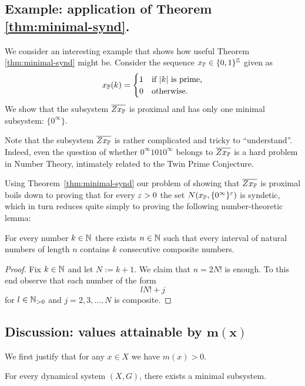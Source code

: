 \subsection*{Example: application of Theorem \ref{thm:minimal-synd}.}
\begin{example}
We consider an interesting example that shows how useful Theorem \ref{thm:minimal-synd} might be. Consider the sequence $x_{\mathbb{P}}\in \{0,1\}^{\mathbb{Z}}$ 
given as
$$
x_{\mathbb{P}}(k) = \begin{cases}
1 & \mbox{if $|k|$ is prime,} \\
0 & \mbox{otherwise.}\end{cases}$$
\noindent We show that the subsystem $\overline{Zx_{\mathbb{P}}}$ is proximal and has only one minimal subsystem: $\{0^\infty\}$.

Note that the subsystem $\overline{Zx_{\mathbb{P}}}$ is rather complicated and tricky to ``understand''. Indeed, even the question of whether $0^\infty 1 0 1 0^\infty$ belongs to $\overline{Zx_{\mathbb{P}}}$ is a hard problem in Number Theory, intimately related to the Twin Prime Conjecture.

Using Theorem~\ref{thm:minimal-synd} our problem of showing that $\overline{Zx_{\mathbb{P}}}$ is proximal boils down to proving that for every $\varepsilon>0$ the set $N(x_{\mathbb{P}}, \{0^\infty\}^\varepsilon)$ is syndetic, which in turn reduces quite simply to proving the following number-theoretic lemma:
\end{example}
\begin{lem}
For every number $k\in \mathbb{N}$ there exists $n\in \mathbb{N}$ such that every interval of natural numbers of length $n$ contains $k$ consecutive composite numbers.
\end{lem}
\begin{proof}
Fix $k\in\mathbb{N}$ and let $N:=k+1$. We claim that $n=2N!$ is enough.
To this end observe that each number of the form
\[lN! + j\]
for $l\in \mathbb{N}_{>0}$ and $j=2,3, \ldots, N$ is composite.
\end{proof}

\subsection*{Discussion: values attainable by $\bm{m(x)}$}

We first justify that for any $x\in X$ we have $m(x)>0$.

\begin{lem}\label{lem:mx_non-zero}
For every dynamical system $(X,G)$, there exists a minimal subsystem.
\end{lem}

